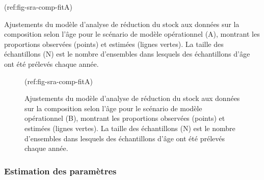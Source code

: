 \documentclass[11pt]{book}
\begin{document}
(ref:fig-sra-comp-fitA)

Ajustements du modèle d'analyse de réduction du stock aux données sur la composition selon l'âge pour le scénario de modèle opérationnel (A), montrant les proportions observées (points) et estimées (lignes vertes). La taille des échantillons (N) est le nombre d'ensembles dans lesquels des échantillons d'âge ont été prélevés chaque année.
\begin{figure}[htb]

{\centering {} 

}

\caption{(ref:fig-sra-comp-fitA)}\label{fig:sra-conditioned-comp-fitA}
\end{figure}
\clearpage


\begin{figure}[htb]

{\centering {} 

}

\caption{Ajustements du modèle d'analyse de réduction du stock aux données sur la composition selon l'âge pour le scénario de modèle opérationnel (B), montrant les proportions observées (points) et estimées (lignes vertes). La taille des échantillons (N) est le nombre d'ensembles dans lesquels des échantillons d'âge ont été prélevés chaque année.}\label{fig:sra-conditioned-comp-fitB}
\end{figure}
\hypertarget{sec:approach3-conditioning-parameters}{%
\subsubsection{Estimation des paramètres}\label{sec:approach3-conditioning-parameters}}
\end{document}
